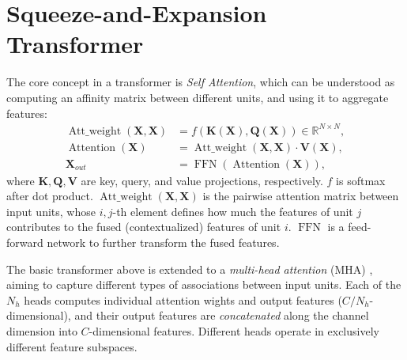 \documentclass{article}
\begin{document}
\section{Squeeze-and-Expansion Transformer} \label{s-e-trans}
The core concept in a transformer is \emph{Self Attention}, which can be understood as computing an affinity matrix between different units, and using it to aggregate features:
\begin{align}
\operatorname{Att\_weight}(\boldsymbol{X},\boldsymbol{X}) & = f(\boldsymbol{K}(\boldsymbol{X}), \boldsymbol{Q}(\boldsymbol{X})) \in \mathbb{R}^{N \times N}, \\
 \operatorname{Attention}(\boldsymbol{X}) &= \operatorname{Att\_weight}(\boldsymbol{X},\boldsymbol{X}) \cdot \boldsymbol{V}(\boldsymbol{X}), \label{attention-eqn} \\ 
\boldsymbol{X}_{out} &= \operatorname{FFN}(\operatorname{Attention}(\boldsymbol{X})), 
\end{align}
where $\boldsymbol{K}, \boldsymbol{Q}, \boldsymbol{V}$ are key, query, and value projections, respectively. $f$ is softmax after dot product. $\operatorname{Att\_weight}(\boldsymbol{X},\boldsymbol{X})$ is the pairwise attention matrix between input units, whose $i,j$-th element defines how much the features of unit $j$ contributes to the fused (contextualized) features of unit $i$.  $\operatorname{FFN}$ is a feed-forward network to further transform the fused features.

The basic transformer above is extended to a \emph{multi-head attention} (MHA) \cite{transformer,analyze-multi-head}, aiming to capture different types of associations between input units. Each of the $N_h$ heads computes individual attention wights and output features ($C/N_h$-dimensional), and their output features are \emph{concatenated} along the channel dimension into $C$-dimensional features. Different heads operate in exclusively different feature subspaces. 
\end{document}
